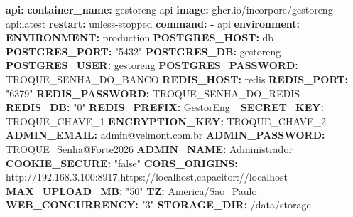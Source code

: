 \documentclass[
  10pt,
]{article}
\newenvironment{Shaded}{\begin{snugshade}}{\end{snugshade}}
\newcommand{\AttributeTok}[1]{\textcolor[rgb]{0.13,0.29,0.53}{#1}}
\newcommand{\FunctionTok}[1]{\textcolor[rgb]{0.13,0.29,0.53}{\textbf{#1}}}
\newcommand{\KeywordTok}[1]{\textcolor[rgb]{0.13,0.29,0.53}{\textbf{#1}}}
\newcommand{\StringTok}[1]{\textcolor[rgb]{0.31,0.60,0.02}{#1}}
\begin{document}
\begin{Shaded}
\begin{Highlighting}[]
\AttributeTok{  }\FunctionTok{api}\KeywordTok{:}
\AttributeTok{    }\FunctionTok{container\_name}\KeywordTok{:}\AttributeTok{ gestoreng{-}api}
\AttributeTok{    }\FunctionTok{image}\KeywordTok{:}\AttributeTok{ ghcr.io/incorpore/gestoreng{-}api:latest}
\AttributeTok{    }\FunctionTok{restart}\KeywordTok{:}\AttributeTok{ unless{-}stopped}
\AttributeTok{    }\FunctionTok{command}\KeywordTok{:}
\AttributeTok{      }\KeywordTok{{-}}\AttributeTok{ api}
\AttributeTok{    }\FunctionTok{environment}\KeywordTok{:}
\AttributeTok{      }\FunctionTok{ENVIRONMENT}\KeywordTok{:}\AttributeTok{ production}
\AttributeTok{      }\FunctionTok{POSTGRES\_HOST}\KeywordTok{:}\AttributeTok{ db}
\AttributeTok{      }\FunctionTok{POSTGRES\_PORT}\KeywordTok{:}\AttributeTok{ }\StringTok{"5432"}
\AttributeTok{      }\FunctionTok{POSTGRES\_DB}\KeywordTok{:}\AttributeTok{ gestoreng}
\AttributeTok{      }\FunctionTok{POSTGRES\_USER}\KeywordTok{:}\AttributeTok{ gestoreng}
\AttributeTok{      }\FunctionTok{POSTGRES\_PASSWORD}\KeywordTok{:}\AttributeTok{ TROQUE\_SENHA\_DO\_BANCO}
\AttributeTok{      }\FunctionTok{REDIS\_HOST}\KeywordTok{:}\AttributeTok{ redis}
\AttributeTok{      }\FunctionTok{REDIS\_PORT}\KeywordTok{:}\AttributeTok{ }\StringTok{"6379"}
\AttributeTok{      }\FunctionTok{REDIS\_PASSWORD}\KeywordTok{:}\AttributeTok{ TROQUE\_SENHA\_DO\_REDIS}
\AttributeTok{      }\FunctionTok{REDIS\_DB}\KeywordTok{:}\AttributeTok{ }\StringTok{"0"}
\AttributeTok{      }\FunctionTok{REDIS\_PREFIX}\KeywordTok{:}\AttributeTok{ GestorEng\_}
\AttributeTok{      }\FunctionTok{SECRET\_KEY}\KeywordTok{:}\AttributeTok{ TROQUE\_CHAVE\_1}
\AttributeTok{      }\FunctionTok{ENCRYPTION\_KEY}\KeywordTok{:}\AttributeTok{ TROQUE\_CHAVE\_2}
\AttributeTok{      }\FunctionTok{ADMIN\_EMAIL}\KeywordTok{:}\AttributeTok{ admin@velmont.com.br}
\AttributeTok{      }\FunctionTok{ADMIN\_PASSWORD}\KeywordTok{:}\AttributeTok{ TROQUE\_Senha@Forte2026}
\AttributeTok{      }\FunctionTok{ADMIN\_NAME}\KeywordTok{:}\AttributeTok{ Administrador}
\AttributeTok{      }\FunctionTok{COOKIE\_SECURE}\KeywordTok{:}\AttributeTok{ }\StringTok{"false"}
\AttributeTok{      }\FunctionTok{CORS\_ORIGINS}\KeywordTok{:}\AttributeTok{ http://192.168.3.100:8917,https://localhost,capacitor://localhost}
\AttributeTok{      }\FunctionTok{MAX\_UPLOAD\_MB}\KeywordTok{:}\AttributeTok{ }\StringTok{"50"}
\AttributeTok{      }\FunctionTok{TZ}\KeywordTok{:}\AttributeTok{ America/Sao\_Paulo}
\AttributeTok{      }\FunctionTok{WEB\_CONCURRENCY}\KeywordTok{:}\AttributeTok{ }\StringTok{"3"}
\AttributeTok{      }\FunctionTok{STORAGE\_DIR}\KeywordTok{:}\AttributeTok{ /data/storage}

\end{Highlighting}
\end{Shaded}
\end{document}
